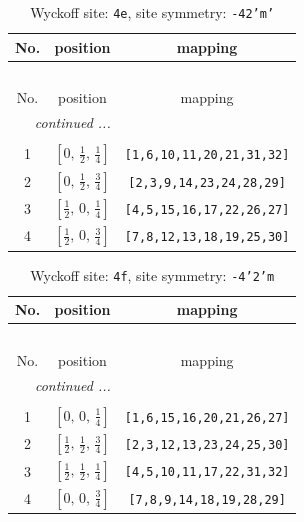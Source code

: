 \documentclass[fleqn,8pt]{jsarticle}
\begin{document}
\renewcommand{\arraystretch}{1.2}
\begin{longtable}{ccc}
\caption{Wyckoff site: {\tt 4e}, site symmetry: {\tt -42'm'}}
 \\
 \hline \hline
No. & position & mapping \\ \hline \endfirsthead

\multicolumn{2}{l}{\tablename\ \thetable{}} \\
 \hline \hline
No. & position & mapping \\ \hline \endhead

 \hline \hline
\multicolumn{2}{r}{\footnotesize\it continued ...} \\ \endfoot

 \hline \hline
\multicolumn{2}{r}{} \\ \endlastfoot

1 & $\left[ 0,\, \frac{1}{2},\, \frac{1}{4} \right]$ & {\tt [1,6,10,11,20,21,31,32]} \\ \hline
2 & $\left[ 0,\, \frac{1}{2},\, \frac{3}{4} \right]$ & {\tt [2,3,9,14,23,24,28,29]} \\ \hline
3 & $\left[ \frac{1}{2},\, 0,\, \frac{1}{4} \right]$ & {\tt [4,5,15,16,17,22,26,27]} \\ \hline
4 & $\left[ \frac{1}{2},\, 0,\, \frac{3}{4} \right]$ & {\tt [7,8,12,13,18,19,25,30]} \\
\end{longtable}
\renewcommand{\arraystretch}{1.2}
\begin{longtable}{ccc}
\caption{Wyckoff site: {\tt 4f}, site symmetry: {\tt -4'2'm}}
 \\
 \hline \hline
No. & position & mapping \\ \hline \endfirsthead

\multicolumn{2}{l}{\tablename\ \thetable{}} \\
 \hline \hline
No. & position & mapping \\ \hline \endhead

 \hline \hline
\multicolumn{2}{r}{\footnotesize\it continued ...} \\ \endfoot

 \hline \hline
\multicolumn{2}{r}{} \\ \endlastfoot

1 & $\left[ 0,\, 0,\, \frac{1}{4} \right]$ & {\tt [1,6,15,16,20,21,26,27]} \\ \hline
2 & $\left[ \frac{1}{2},\, \frac{1}{2},\, \frac{3}{4} \right]$ & {\tt [2,3,12,13,23,24,25,30]} \\ \hline
3 & $\left[ \frac{1}{2},\, \frac{1}{2},\, \frac{1}{4} \right]$ & {\tt [4,5,10,11,17,22,31,32]} \\ \hline
4 & $\left[ 0,\, 0,\, \frac{3}{4} \right]$ & {\tt [7,8,9,14,18,19,28,29]} \\
\end{longtable}
\end{document}
